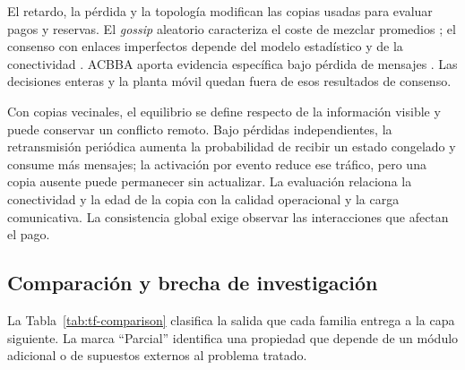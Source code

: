 El retardo, la pérdida y la topología modifican las copias usadas para evaluar pagos y reservas. El \emph{gossip} aleatorio caracteriza el coste de mezclar promedios \parencite{boyd2006randomizedGossip}; el consenso con enlaces imperfectos depende del modelo estadístico y de la conectividad \parencite{kar2009imperfectConsensus,nedic2010constrainedConsensus}. ACBBA aporta evidencia específica bajo pérdida de mensajes \parencite{rantanen2018lossyAcbba}. Las decisiones enteras y la planta móvil quedan fuera de esos resultados de consenso.

Con copias vecinales, el equilibrio se define respecto de la información visible y puede conservar un conflicto remoto. Bajo pérdidas independientes, la retransmisión periódica aumenta la probabilidad de recibir un estado congelado y consume más mensajes; la activación por evento reduce ese tráfico, pero una copia ausente puede permanecer sin actualizar. La evaluación relaciona la conectividad y la edad de la copia con la calidad operacional y la carga comunicativa. La consistencia global exige observar las interacciones que afectan el pago.

\subsection{Comparación y brecha de investigación}
\label{subsec:tf-synthesis-gap}

La Tabla~\ref{tab:tf-comparison} clasifica la salida que cada familia entrega a la capa siguiente. La marca ``Parcial'' identifica una propiedad que depende de un módulo adicional o de supuestos externos al problema tratado.

